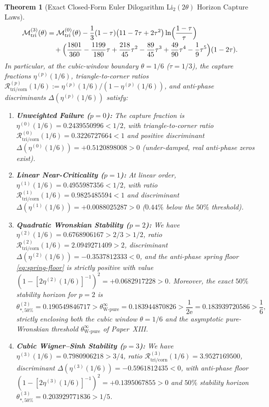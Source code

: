 \documentclass[11pt,reqno]{amsart}
\newtheorem{theorem}{Theorem}[section]
\theoremstyle{definition}
\theoremstyle{remark}
\numberwithin{equation}{section}
\newcommand{\ee}{\mathrm{e}}
\newcommand{\tri}{\mathrm{tri}}
\newcommand{\corn}{\mathrm{corn}}
\begin{document}
\begin{theorem}[Exact Closed-Form Euler Dilogarithm $\mathrm{Li}_2(2\theta)$ Horizon Capture Laws]
\begin{align}
\mathcal{M}_{\tri}^{(3)}(\theta) &= \mathcal{M}_{\tri}^{(0)}(\theta) - \frac{1}{3}(1-\tau)\bigl(11 - 7\tau + 2\tau^2\bigr)\ln\Bigl(\frac{1-\tau}{\tau}\Bigr) \nonumber\\
&\quad + \Bigl(\frac{1801}{360} - \frac{1199}{180}\tau + \frac{218}{45}\tau^2 - \frac{89}{45}\tau^3 + \frac{49}{90}\tau^4 - \frac{1}{9}\tau^5\Bigr)(1-2\tau). \label{eq:M-tri-3}
\end{align}
In particular, at the cubic-window boundary $\theta = 1/6$ ($\tau = 1/3$), the capture fractions $\eta^{(p)}(1/6)$, triangle-to-corner ratios $\mathcal{R}_{\tri/\corn}^{(p)}(1/6) := \eta^{(p)}(1/6)/(1-\eta^{(p)}(1/6))$, and anti-phase discriminants $\Delta(\eta^{(p)}(1/6))$ satisfy:
\begin{enumerate}[label=\upshape(\roman*),leftmargin=2.2em]
\item \textbf{Unweighted Failure ($p=0$):} The capture fraction is $\eta^{(0)}(1/6) = 0.2439550996 < 1/2$, with triangle-to-corner ratio $\mathcal{R}_{\tri/\corn}^{(0)}(1/6) = 0.3226727664 < 1$ and positive discriminant $\Delta(\eta^{(0)}(1/6)) = +0.5120898008 > 0$ (under-damped, real anti-phase zeros exist).
\item \textbf{Linear Near-Criticality ($p=1$):} At linear order, $\eta^{(1)}(1/6) = 0.4955987356 < 1/2$, with ratio $\mathcal{R}_{\tri/\corn}^{(1)}(1/6) = 0.9825485594 < 1$ and discriminant $\Delta(\eta^{(1)}(1/6)) = +0.0088025287 > 0$ ($0.44\%$ below the $50\%$ threshold).
\item \textbf{Quadratic Wronskian Stability ($p=2$):} We have $\eta^{(2)}(1/6) = 0.6768906167 > 2/3 > 1/2$, ratio $\mathcal{R}_{\tri/\corn}^{(2)}(1/6) = 2.0949271409 > 2$, discriminant $\Delta(\eta^{(2)}(1/6)) = -0.3537812333 < 0$, and the anti-phase spring floor \eqref{eq:spring-floor} is strictly positive with value $(1 - [2\eta^{(2)}(1/6)]^{-1})^2 = +0.0682917228 > 0$. Moreover, the exact $50\%$ stability horizon for $p=2$ is
\begin{equation}\label{eq:theta-50-p2}
\theta_{*,50\%}^{(2)} = 0.190549846717 > \theta_{\mathrm{W\text{-}pure}}^\infty = 0.183944870826 > \frac{1}{2\ee} = 0.183939720586 > \frac{1}{6},
\end{equation}
strictly enclosing both the cubic window $\theta=1/6$ and the asymptotic pure-Wronskian threshold $\theta_{\mathrm{W\text{-}pure}}^\infty$ of Paper~XIII.
\item \textbf{Cubic Wigner--Sinh Stability ($p=3$):} We have $\eta^{(3)}(1/6) = 0.7980906218 > 3/4$, ratio $\mathcal{R}_{\tri/\corn}^{(3)}(1/6) = 3.9527169500$, discriminant $\Delta(\eta^{(3)}(1/6)) = -0.5961812435 < 0$, with anti-phase floor $(1 - [2\eta^{(3)}(1/6)]^{-1})^2 = +0.1395067855 > 0$ and $50\%$ stability horizon $\theta_{*,50\%}^{(3)} = 0.203929771836 > 1/5$.
\end{enumerate}
\end{theorem}
\end{document}
